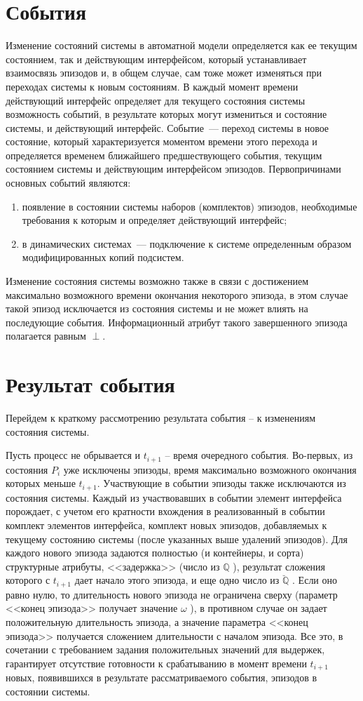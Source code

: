 \section{События}
Изменение состояний системы в автоматной модели определяется как ее текущим состоянием, так и действующим интерфейсом, который устанавливает взаимосвязь эпизодов и, в общем случае, сам тоже может изменяться при переходах системы к новым состояниям. В каждый момент времени действующий интерфейс определяет для текущего состояния системы возможность событий, в результате которых могут измениться и состояние системы, и действующий интерфейс. 
Событие~--- переход системы в новое состояние, который характеризуется моментом времени этого перехода и определяется временем ближайшего предшествующего события, текущим состоянием системы и действующим интерфейсом эпизодов. 
Первопричинами основных событий являются: 
\begin{enumerate}[label=\arabic*)]
	\item появление в состоянии системы наборов (комплектов) эпизодов, необходимые требования к которым и определяет действующий интерфейс;
	\item в динамических системах~--- подключение к системе определенным образом модифицированных копий подсистем. 
\end{enumerate}
Изменение состояния системы возможно также в связи с достижением максимально возможного времени окончания некоторого эпизода, в этом случае такой эпизод исключается из состояния системы и не может влиять на последующие события. 
Информационный атрибут такого завершенного эпизода полагается равным $ \perp $. 

\section{Результат события}
Перейдем к краткому рассмотрению результата события – к изменениям состояния системы.

Пусть процесс не обрывается и $ t_{i+1} $  – время очередного события. 
Во-первых, из состояния $ P_i $ уже исключены эпизоды, время максимально возможного окончания которых меньше $ t_{i+1} $. 
Участвующие в событии эпизоды также исключаются из состояния системы. 
Каждый из участвовавших в событии элемент интерфейса порождает, с учетом его кратности вхождения в реализованный в событии комплект элементов интерфейса, комплект новых эпизодов, добавляемых к текущему состоянию системы (после указанных выше удалений эпизодов). 
Для каждого нового эпизода задаются полностью (и контейнеры, и сорта) структурные атрибуты, <<задержка>> (число из $ \mathbb{Q} $ ), результат сложения которого с  $ t_{i+1} $  дает начало этого эпизода, и еще одно число из $ \breve{\mathbb{Q}} $ . 
Если оно равно нулю, то длительность нового эпизода не ограничена сверху (параметр <<конец эпизода>> получает значение $ \omega $ ), в противном случае он задает положительную длительность эпизода, а значение параметра <<конец эпизода>> получается сложением длительности с началом эпизода. 
Все это, в сочетании с требованием задания положительных значений для выдержек, гарантирует отсутствие готовности к срабатыванию в момент времени $ t_{i+1} $ новых, появившихся в результате рассматриваемого события, эпизодов в состоянии системы. 

